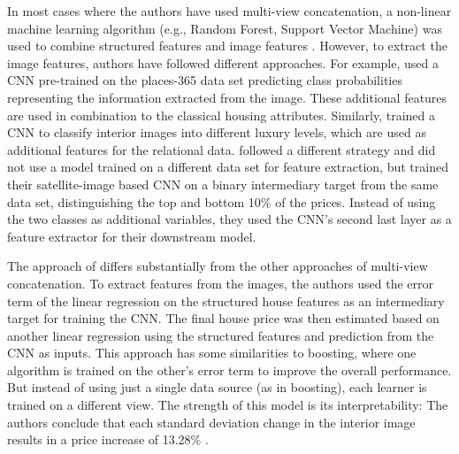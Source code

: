 \documentclass[letterpaper]{article} %
\begin{document}
In most cases where the authors have used multi-view concatenation, a non-linear machine learning algorithm (e.g., Random Forest, Support Vector Machine) was used to combine structured features and image features \cite{bency2017beyond, poursaeed2018vision, bessinger2016quantifying}. However, to extract the image features, authors have followed different approaches. For example, \citeauthor{bessinger2016quantifying} \citeyearpar{bessinger2016quantifying} used a CNN pre-trained on the places-365 data set predicting class probabilities representing the information extracted from the image. These additional features are used in combination to the classical housing attributes. Similarly, \citeauthor{poursaeed2018vision} \citeyearpar{poursaeed2018vision} trained a CNN to classify interior images into different luxury levels, which are used as additional features for the relational data. \citeauthor{bency2017beyond} \citeyearpar{bency2017beyond} followed a different strategy and did not use a model trained on a different data set for feature extraction, but trained their satellite-image based CNN on a binary intermediary target from the same data set, distinguishing the top and bottom 10\% of the prices. Instead of using the two classes as additional variables, they used the CNN's second last layer as a feature extractor for their downstream model.

The approach of \citeauthor{naumzik2020one} \citeyearpar{naumzik2020one} differs substantially from the other approaches of multi-view concatenation. To extract features from the images, the authors used the error term of the linear regression on the structured house features as an intermediary target for training the CNN. The final house price was then estimated based on another linear regression using the structured features and prediction from the CNN as inputs. This approach has some similarities to boosting, where one algorithm is trained on the other's error term to improve the overall performance. But instead of using just a single data source (as in boosting), each learner is trained on a different view. The strength of this model is its interpretability: The authors conclude that each standard deviation change in the interior image results in a price increase of 13.28\% \cite{naumzik2020one}.
\end{document}
